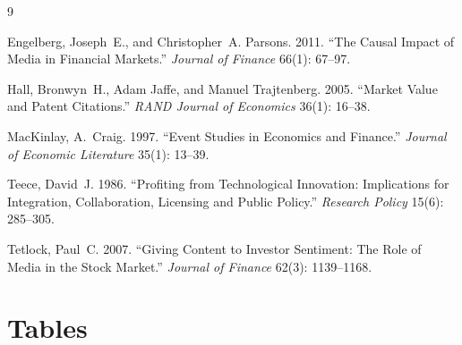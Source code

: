 \documentclass[12pt]{article}
\begin{document}
\newpage

\begin{thebibliography}{9}

Engelberg, Joseph~E., and Christopher~A. Parsons. 2011.
``The Causal Impact of Media in Financial Markets.''
\textit{Journal of Finance} 66(1): 67--97.

Hall, Bronwyn~H., Adam Jaffe, and Manuel Trajtenberg. 2005.
``Market Value and Patent Citations.''
\textit{RAND Journal of Economics} 36(1): 16--38.

MacKinlay, A.~Craig. 1997.
``Event Studies in Economics and Finance.''
\textit{Journal of Economic Literature} 35(1): 13--39.

Teece, David~J. 1986.
``Profiting from Technological Innovation: Implications for Integration,
Collaboration, Licensing and Public Policy.''
\textit{Research Policy} 15(6): 285--305.

Tetlock, Paul~C. 2007.
``Giving Content to Investor Sentiment: The Role of Media in the Stock Market.''
\textit{Journal of Finance} 62(3): 1139--1168.


\end{thebibliography}

\newpage
\section*{Tables}
\end{document}
